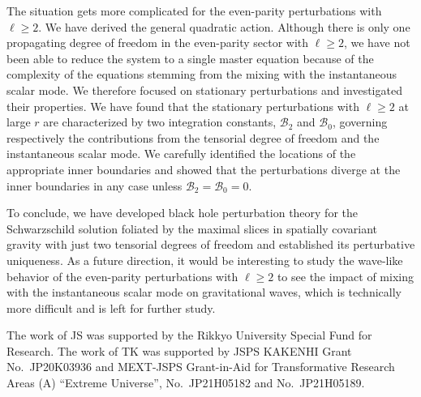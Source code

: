 \documentclass[aps,prd,preprintnumbers,superscriptaddress,nofootinbib,notitlepage]{revtex4-2}
\begin{document}
The situation gets more complicated for the even-parity perturbations with $\ell\ge 2$.
We have derived the general quadratic action.
Although there is only one propagating degree of freedom
in the even-parity sector with $\ell\ge 2$,
we have not been able to reduce the system to a single master equation
because of the complexity of the equations stemming from the mixing with
the instantaneous scalar mode.
We therefore focused on stationary perturbations and investigated their properties.
We have found that the stationary perturbations with $\ell\ge 2$ at large $r$
are characterized by two integration constants,
$\mathcal{B}_2$ and $\mathcal{B}_0$, governing respectively the contributions
from the tensorial degree of freedom and the instantaneous scalar mode.
We carefully identified the locations of the appropriate inner boundaries
and showed that the perturbations diverge at the inner boundaries in any case
unless $\mathcal{B}_2=\mathcal{B}_0=0$.


To conclude, we have developed black hole perturbation theory
for the Schwarzschild solution foliated by the maximal slices
in spatially covariant gravity with just two tensorial degrees of freedom
and established its perturbative uniqueness.
As a future direction, it would be interesting to study the wave-like behavior of
the even-parity perturbations with $\ell\ge 2$ to see the impact of mixing with
the instantaneous scalar mode on gravitational waves,
which is technically more difficult and is left for further study.






\acknowledgments
The work of JS was supported by
the Rikkyo University Special Fund for Research.
The work of TK was supported by
JSPS KAKENHI Grant No.~JP20K03936 and
MEXT-JSPS Grant-in-Aid for Transformative Research Areas (A) ``Extreme Universe'',
No.~JP21H05182 and No.~JP21H05189.







\end{document}
